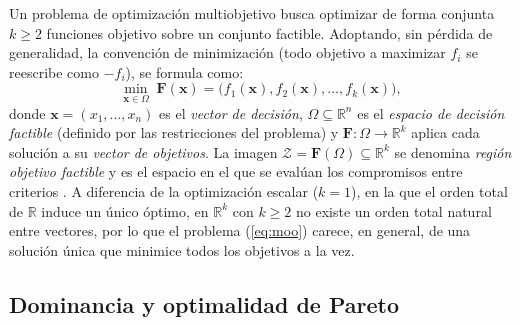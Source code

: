 Un problema de optimización multiobjetivo busca optimizar de forma conjunta $k \geq 2$ funciones objetivo sobre un conjunto factible. Adoptando, sin pérdida de generalidad, la convención de minimización (todo objetivo a maximizar $f_i$ se reescribe como $-f_i$), se formula como:
\begin{equation} \label{eq:moo}
	\min_{\mathbf{x} \in \Omega} \; \mathbf{F}(\mathbf{x}) = \bigl(f_1(\mathbf{x}), f_2(\mathbf{x}), \ldots, f_k(\mathbf{x})\bigr),
\end{equation}
donde $\mathbf{x} = (x_1, \ldots, x_n)$ es el \textit{vector de decisión}, $\Omega \subseteq \mathbb{R}^n$ es el \textit{espacio de decisión factible} (definido por las restricciones del problema) y $\mathbf{F}: \Omega \to \mathbb{R}^k$ aplica cada solución a su \textit{vector de objetivos}. La imagen $\mathcal{Z} = \mathbf{F}(\Omega) \subseteq \mathbb{R}^k$ se denomina \textit{región objetivo factible} y es el espacio en el que se evalúan los compromisos entre criterios \citep{miettinen1999nonlinear, deb2011multi}. A diferencia de la optimización escalar ($k=1$), en la que el orden total de $\mathbb{R}$ induce un único óptimo, en $\mathbb{R}^k$ con $k \geq 2$ no existe un orden total natural entre vectores, por lo que el problema (\ref{eq:moo}) carece, en general, de una solución única que minimice todos los objetivos a la vez.

\subsection{Dominancia y optimalidad de Pareto} \label{subsec:pareto}

